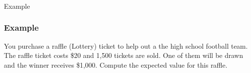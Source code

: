 

\begin{frame}[fragile]\frametitle{}
\begin{center}
{\Large Example}
\end{center}
\end{frame}

\begin{frame}
\frametitle{Example}
You purchase a raffle (Lottery) ticket to help out a the high school football team. The raffle ticket costs \$20 and 1,500 tickets are sold. One of them will be drawn and the winner receives \$1,000. Compute the expected value for this raffle.
\end{frame}


